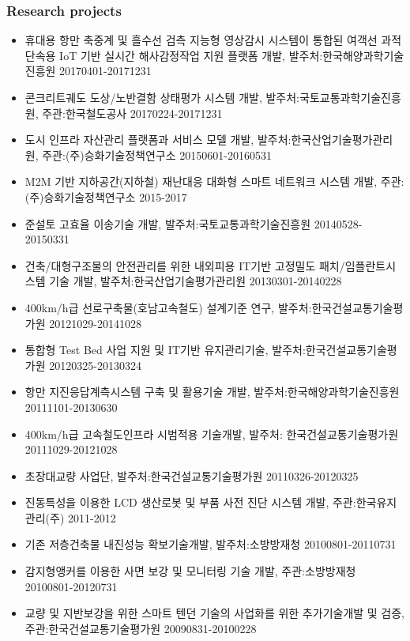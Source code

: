 \subsubsection{Research projects}
\begin{itemize}
\item 휴대용 항만 축중계 및 흘수선 검측 지능형 영상감시 시스템이 통합된 여객선 과적 단속용 IoT 기반 실시간 해사감정작업 지원 플랫폼 개발, 발주처:한국해양과학기술진흥원 \hfill 20170401-20171231
\item 콘크리트궤도 도상/노반결함 상태평가 시스템 개발, 발주처:국토교통과학기술진흥원, 주관:한국철도공사 \hfill20170224-20171231
\item 도시 인프라 자산관리 플랫폼과 서비스 모델 개발, 발주처:한국산업기술평가관리원, 주관:(주)승화기술정책연구소 \hfill 20150601-20160531
\item M2M 기반 지하공간(지하철) 재난대응 대화형 스마트 네트워크 시스템 개발, 주관:(주)승화기술정책연구소 \hfill2015-2017
\item 준설토 고효율 이송기술 개발, 발주처:국토교통과학기술진흥원 \hfill 20140528-20150331
\item 건축/대형구조물의 안전관리를 위한 내외피용 IT기반 고정밀도 패치/임플란트시스템 기술 개발, 발주처:한국산업기술평가관리원 \hfill 20130301-20140228
\item 400km/h급 선로구축물(호남고속철도) 설계기준 연구, 발주처:한국건설교통기술평가원 \hfill 20121029-20141028
\item 통합형 Test Bed 사업 지원 및 IT기반 유지관리기술, 발주처:한국건설교통기술평가원 \hfill 20120325-20130324
\item 항만 지진응답계측시스템 구축 및 활용기술 개발, 발주처:한국해양과학기술진흥원 \hfill 20111101-20130630
\item 400km/h급 고속철도인프라 시범적용 기술개발, 발주처: 한국건설교통기술평가원 \hfill 20111029-20121028
\item 초장대교량 사업단, 발주처:한국건설교통기술평가원 \hfill 20110326-20120325
\item 진동특성을 이용한 LCD 생산로봇 및 부품 사전 진단 시스템 개발, 주관:한국유지관리(주) \hfill2011-2012
\item 기존 저층건축물 내진성능 확보기술개발, 발주처:소방방재청 \hfill 20100801-20110731
\item 감지형앵커를 이용한 사면 보강 및 모니터링 기술 개발, 주관:소방방재청 \hfill 20100801-20120731
\item 교량 및 지반보강을 위한 스마트 텐던 기술의 사업화를 위한 추가기술개발 및 검증, 주관:한국건설교통기술평가원 \hfill 20090831-20100228

\end{itemize}
